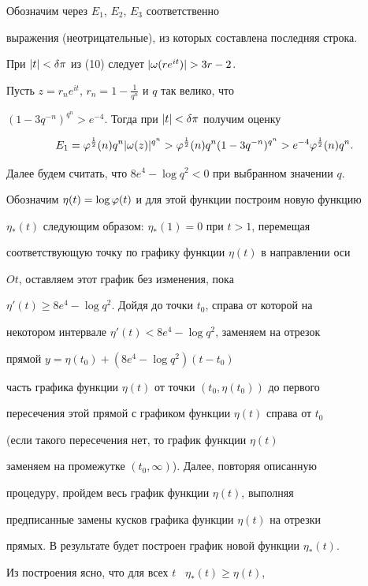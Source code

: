 Обозначим через $E_1$, $E_2$, $E_3$ соответственно


выражения (неотрицательные), из которых составлена последняя строка.


При $|t|<\delta\pi$ из (10) следует $|\om(re^{it})|>3r-2$.





Пусть $z=r_ne^{it}$, $r_n=1-\frac{1}{q^n}$ и $q$ так велико, что


$(1-3q^{-n})^{q^n}>e^{-4}$. Тогда при $|t|<\delta\pi$ получим оценку


$$


E_1=\p^{\frac 12}(n)q^n|\om(z)|^{q^n}>\p^{\frac 12}(n)q^n(1-3q^{-n})^{


q^n}>e^{-4}\p^{\frac 12}(n)q^n.


$$





Далее будем считать, что $8e^4-\log q^2<0$ при выбранном значении $q$.


Обозначим $\eta(t)=\log\varphi(t)$ и для этой функции построим новую функцию


$\eta_*(t)$ следующим образом: $\eta_*(1)=0$ при $t>1$, перемещая


соответствующую точку по графику функции $\eta(t)$ в направлении оси


$Ot$, оставляем этот график без изменения, пока


$\eta'(t)\ge 8e^4-\log q^2$. Дойдя до точки $t_0$, справа от которой на


некотором интервале $\eta'(t)<8e^4-\log q^2$, заменяем на отрезок


прямой $y=\eta(t_0)+(8e^4-\log q^2)(t-t_0)$


часть графика функции $\eta(t)$ от точки $(t_0,\eta(t_0))$ до первого


пересечения этой прямой с графиком функции $\eta(t)$ справа от $t_0$


(если такого пересечения нет, то график функции $\eta(t)$


заменяем на промежутке $(t_0,\infty)$). Далее, повторяя описанную


процедуру, пройдем весь график функции $\eta(t)$, выполняя


предписанные замены кусков графика функции $\eta(t)$ на отрезки


прямых. В результате будет построен график новой функции $\eta_*(t)$.


Из построения ясно, что для всех $t$ \ $\eta_*(t)\ge\eta(t)$,


